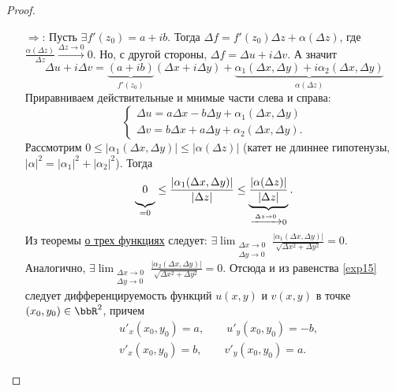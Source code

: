 \begin{proof}
$ $\linebreak
\vspace*{-\baselineskip}
\begin{itemize}
\item[$\Longrightarrow$:]
Пусть $\exists f'(z_0) = a+ib $. Тогда $\Delta f = f'(z_0)\Delta z + \alpha(\Delta z)$, где $\frac{\alpha(\Delta z)}{\Delta z}\xrightarrow{\Delta z \to 0}0$. Но, с другой стороны, $\Delta f = \Delta u + i \Delta v$. А значит
$$
\Delta u + i \Delta v = \underbrace{(a+ib)}_{f'(z_0)}(\Delta x + i \Delta y) + \underbrace{\alpha_1(\Delta x, \Delta y) +i \alpha_2(\Delta x, \Delta y)}_{\alpha(\Delta z)}
$$
Приравниваем действительные и мнимые части слева и справа:
\begin{equation}
\label{exp15}
\begin{cases}
\Delta u = a\Delta x - b \Delta y + \alpha_1(\Delta x, \Delta y) \\
\Delta v = b\Delta x + a \Delta y + \alpha_2(\Delta x, \Delta y).
\end{cases}
\end{equation}
Рассмотрим $0 \le |\alpha_1(\Delta x, \Delta y)| \le |\alpha(\Delta z)|$ (катет не длиннее гипотенузы, $|\alpha|^2=|\alpha_1|^2 + |\alpha_2|^2 $). Тогда
$$
\underbrace{{{\vphantom{\frac{0}{0}}}}0}_{=0} \le \frac{|\alpha_1(\Delta x, \Delta y)|}{|\Delta z|} \le \underbrace{\frac{|\alpha(\Delta z)|}{|\Delta z|}}_{\xrightarrow{\Delta z \to 0} 0 }.
$$
Из теоремы \hyperref[exp14]{о трех функциях} следует: $\exists \lim_{\substack{\Delta x \to 0\\ \Delta y \to 0}}\limits \frac{|\alpha_1(\Delta x,\Delta y)|}{\sqrt{\Delta x ^2 + \Delta y^2}} = 0.$
Аналогично, $\exists \lim_{\substack{\Delta x \to 0\\ \Delta y \to 0}}\limits \frac{|\alpha_2(\Delta x,\Delta y)|}{\sqrt{\Delta x^2 + \Delta y^2}} = 0$. 
Отсюда и из равенства \eqref{exp15} следует дифференцируемость функций $u(x,y)$ и $v(x,y)$ в точке $(x_0,y_0) \in \bbR^2$, причем 
\begin{equation}
\label{exp16}
\begin{split}
&u'_x(x_0,y_0) = a, \qquad u'_y(x_0,y_0) = -b,\\
&v'_x(x_0,y_0) = b, \qquad v'_y(x_0,y_0) = a.
\end{split}
\end{equation}


\end{itemize}
\end{proof}
